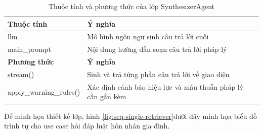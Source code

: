 \documentclass[../DoAn.tex]{subfiles}
\begin{document}
\begin{table}[H]
\centering
\small
\renewcommand{\arraystretch}{1.12}
\begin{tabular}{|p{4.8cm}|p{9.2cm}|}
\hline
\textbf{Thuộc tính} & \textbf{Ý nghĩa} \\ \hline
llm & Mô hình ngôn ngữ sinh câu trả lời cuối \\ \hline
main\_prompt & Nội dung hướng dẫn soạn câu trả lời pháp lý \\ \hline
\textbf{Phương thức} & \textbf{Ý nghĩa} \\ \hline
stream() & Sinh và trả từng phần câu trả lời về giao diện \\ \hline
apply\_warning\_rules() & Xác định cảnh báo hiệu lực và mâu thuẫn pháp lý cần gắn kèm \\ \hline
\end{tabular}
\caption{Thuộc tính và phương thức của lớp SynthesizerAgent}
\label{tab:class-synthesizer-agent}
\end{table}


Để minh họa thiết kế lớp, hình \ref{fig:seq-single-retriever}dưới đây minh họa biểu đồ trình tự cho use case hỏi đáp luật hôn nhân gia đình.


\end{document}
